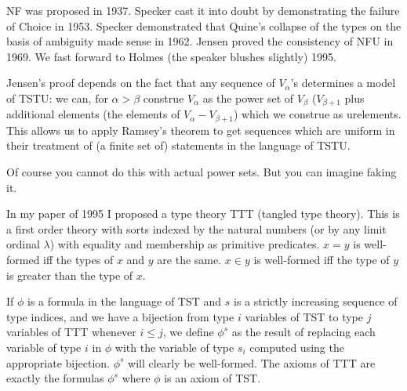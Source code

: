 \documentclass{slides}
\begin{document}
\begin{slide}

NF was proposed in 1937.  Specker cast it into doubt by demonstrating the failure of Choice in 1953.  Specker demonstrated that Quine's collapse of the types on the basis of ambiguity made sense in 1962.
Jensen proved the consistency of NFU in 1969.   We fast forward to Holmes (the speaker blushes slightly) 1995.

Jensen's proof depends on the fact that any sequence of $V_\alpha$'s determines a model of TSTU:  we can, for $\alpha>\beta$ construe $V_\alpha$ as the power set of $V_\beta$ ($V_{\beta+1}$ plus additional elements
(the elements of $V_{\alpha}-V_{\beta+1}$) which we construe as urelements.  This allows us to apply Ramsey's theorem to get sequences which are uniform in their treatment of (a finite set of) statements in the language of TSTU.

Of course you cannot do this with actual power sets.  But you can imagine faking it.

\end{slide}

\begin{slide}

In my paper of 1995 I proposed a type theory TTT (tangled type theory).  This is a first order theory with sorts indexed by the natural numbers (or by any limit ordinal $\lambda$) with equality and membership as primitive predicates.  $x=y$ is well-formed iff the types of $x$ and $y$ are the same.  $x \in y$ is well-formed iff the type of $y$ is greater than the type of $x$.

If $\phi$ is a formula in the language of TST and $s$ is a strictly increasing sequence of type indices, and we have a bijection from type $i$ variables of TST to type $j$ variables of TTT whenever $i\leq j$, we
define $\phi^s$ as the result of replacing each variable of type $i$ in $\phi$ with the variable of type $s_i$ computed using the appropriate bijection.  $\phi^s$ will clearly be well-formed.  The axioms of TTT
are exactly the formulas $\phi^s$ where $\phi$ is an axiom of TST.

\end{slide}
\end{document}
